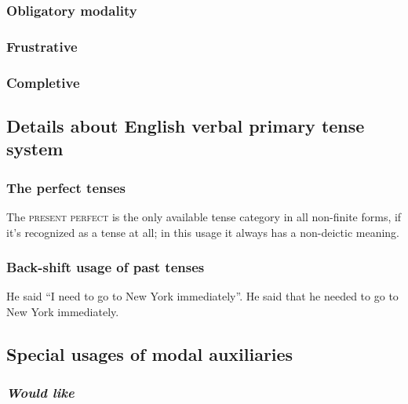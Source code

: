 \documentclass[UTF8, a4paper, oneside, scheme=plain, 12pt]{ctexbook}
\newcommand{\form}[1]{\emph{#1}}
\newcommand{\category}[1]{\textsc{#1}}
\begin{document}
\subsubsection{Obligatory modality}

\subsubsection{Frustrative}

\subsubsection{Completive}

\subsection{Details about English verbal primary tense system}\label{sec:tam.verbal-tense}

\subsubsection{The perfect tenses}

The \category{present perfect} is the only available tense category
in all non-finite forms, 
if it's recognized as a tense at all;
in this usage it always has a non-deictic meaning. 

\subsubsection{Back-shift usage of past tenses}

\begin{exe}
    \ex \begin{xlist}
        \ex He said ``I need to go to New York immediately''.
        \ex He said that he needed to go to New York immediately.
    \end{xlist}
\end{exe}

\subsection{Special usages of modal auxiliaries}\label{sec:verb-inflection.modal-use}

\subsubsection{\form{Would like}}
\end{document}
